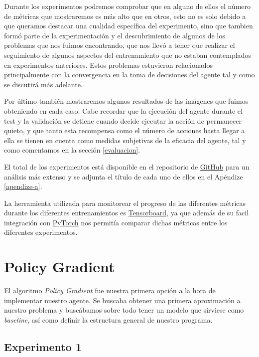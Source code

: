 Durante los experimentos podremos comprobar que en alguno de ellos el número de métricas que mostraremos es más alto que en otros, esto no es solo debido a que queramos destacar una cualidad específica del experimento, sino que tambien formó parte de la experimentación y el descubrimiento de algunos de los problemas que nos fuimos encontrando, que nos llevó a tener que realizar el seguimiento de algunos aspectos del entrenamiento que no estaban contemplados en experimentos anteriores. Estos problemas estuvieron relacionados principalmente con la convergencia en la toma de decisiones del agente tal y como se discutirá más adelante.
\medskip

Por último también mostraremos algunos resultados de las imágenes que fuimos obteniendo en cada caso. Cabe recordar que la ejecución del agente durante el test y la validación se detiene cuando decide ejecutar la acción de permanecer quieto, y que tanto esta recompensa como el número de acciones hasta llegar a ella se tienen en cuenta como medidas subjetivas de la eficacia del agente, tal y como comentamos en la sección \ref{evaluacion}.
\medskip

El total de los experimentos está disponible en el repositorio de \href{https://github.com/lucaswerner90/msc-degree-ai}{GitHub} para un análisis más extenso y se adjunta el título de cada uno de ellos en el Apéndize \ref{apendize-a}. 
\medskip

La herramienta utilizada para monitorear el progreso de las diferentes métricas durante los diferentes entrenamientos es \href{https://www.tensorflow.org/tensorboard?hl=es-419}{Tensorboard}, ya que además de su facil integración con \href{https://pytorch.org/}{PyTorch} nos permitía comparar dichas métricas entre los diferentes experimentos.
\medskip

\section{Policy Gradient}
\label{resultados-policy-gradient}

El algoritmo \textit{Policy Gradient} fue nuestra primera opción a la hora de implementar nuestro agente. Se buscaba obtener una primera aproximación a nuestro problema y buscábamos sobre todo tener un modelo que sirviese como \textit{baseline}, así como definir la estructura general de nuestro programa.
\medskip

\subsection{Experimento 1}
\label{resultados-policy-gradient-experimento-1}

